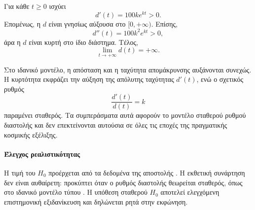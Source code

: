 \begin{alist}
  \item Για κάθε $t\geq0$ ισχύει
        \[
          d'(t)=100k e^{kt}>0.
        \]
        Επομένως, η $d$ είναι γνησίως αύξουσα στο $[0,+\infty)$.
        Επίσης,
        \[
          d''(t)=100k^2e^{kt}>0,
        \]
        άρα η $d$ είναι κυρτή στο ίδιο διάστημα. Τέλος,
        \[
          {\lim_{t\to+\infty}d(t)=+\infty}.
        \]

        Στο ιδανικό μοντέλο, η απόσταση και η ταχύτητα απομάκρυνσης
        αυξάνονται συνεχώς. Η κυρτότητα εκφράζει την αύξηση της απόλυτης
        ταχύτητας $d'(t)$, ενώ ο σχετικός ρυθμός
        \[
          \frac{d'(t)}{d(t)}=k
        \]
        παραμένει σταθερός. Τα συμπεράσματα αυτά αφορούν το μοντέλο
        σταθερού ρυθμού διαστολής και δεν επεκτείνονται αυτούσια σε όλες
        τις εποχές της πραγματικής κοσμικής εξέλιξης.
\end{alist}

\paragraph{Έλεγχος ρεαλιστικότητας}
Η τιμή του $H_0$ προέρχεται από τα δεδομένα της αποστολής 
\cite{planck2020cosmologicalParameters}. Η εκθετική συνάρτηση δεν είναι
αυθαίρετη: προκύπτει όταν ο ρυθμός διαστολής θεωρείται σταθερός, όπως
στο ιδανικό μοντέλο τύπου 
\cite{frieman2008darkEnergy}. Η υπόθεση σταθερού $H_0$ αποτελεί
ελεγχόμενη επιστημονική εξιδανίκευση και δηλώνεται ρητά στην εκφώνηση.
